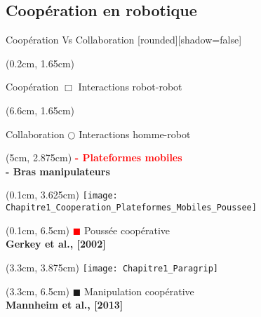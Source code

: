 \documentclass[french]{beamer}
\begin{document}
\subsection{Coopération en robotique}
\begin{frame}{Coopération Vs Collaboration}
[rounded][shadow=false]
{\scriptsize 
\begin{textblock*}{6cm}(0.2cm, 1.65cm)
 \begin{block}{Coopération}
  $\Box$ Interactions robot-robot\\
 \end{block}
\end{textblock*}

\begin{textblock*}{6cm}(6.6cm, 1.65cm)
 \begin{block}{Collaboration}
  $\Circle$ Interactions homme-robot\\
 \end{block}
\end{textblock*}


\begin{textblock*}{4cm}(5cm, 2.875cm)
 \textcolor{red}{\textbf{- Plateformes mobiles}}\\
 \textcolor{vert}{\textbf{- Bras manipulateurs}}
\end{textblock*}
}



\begin{textblock*}{3.1cm}(0.1cm, 3.625cm)
\centering
\texttt{[image: Chapitre1\_Cooperation\_Plateformes\_Mobiles\_Poussee]}
\end{textblock*}
\begin{textblock*}{3.1cm}(0.1cm, 6.5cm)
\centering
\tiny{\textcolor{red}{$\blacksquare$} Poussée coopérative}\\
\tiny{\textbf{Gerkey et al., [2002]}}\\
\end{textblock*}

\begin{textblock*}{3.1cm}(3.3cm, 3.875cm)
\centering
\texttt{[image: Chapitre1\_Paragrip]}
\end{textblock*}
\begin{textblock*}{3.1cm}(3.3cm, 6.5cm)
\centering
\tiny{\textcolor{vert}{$\blacksquare$} Manipulation coopérative}\\
\tiny{\textbf{Mannheim et al., [2013]}}\\
\end{textblock*}


\end{frame}
\end{document}
